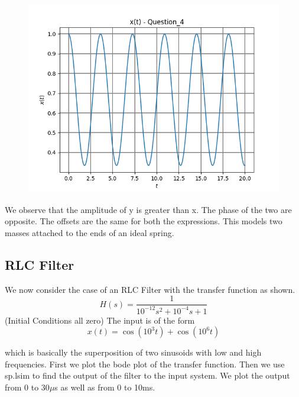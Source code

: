\documentclass[11pt, a4paper]{article}
\begin{document}
\begin{figure}[!tbh]
   	\centering
   	\includegraphics[scale=0.5]{figure3.png}
   	\label{fig:32}
   \end{figure}
{ 
We observe that the amplitude of y is greater than x. 
The phase of the two are opposite.
The offsets are the same for both the expressions.
This models two masses attached to the ends of an ideal spring.
}
\subsection{RLC Filter}
{
We now consider the case of an RLC Filter with the transfer function as shown.
\[ H(s) = \frac{1}{10^{-12}s^2 + 10^{-4}s + 1}\]
(Initial Conditions all zero)
The input is of the form
\[x(t) = \cos{(10^3t)}+\cos{(10^6t)} \]

which is basically the superposition of two sinusoids with low and high frequencies.
First we plot the bode plot of the transfer function.
Then we use sp.lsim to find the output of the filter to the input system.
We plot the output from 0 to 30$\mu$s as well as from 0 to 10ms.
}
\end{document}
